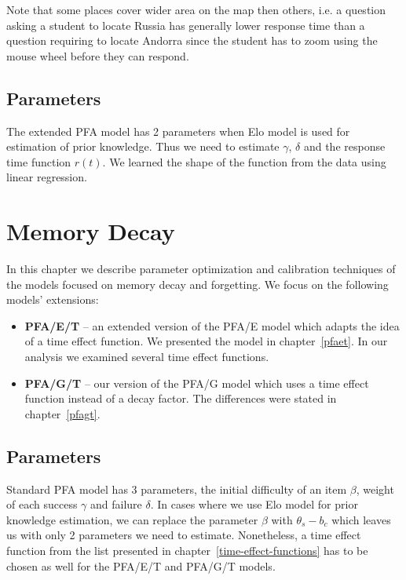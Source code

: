 Note that some places cover wider area on the map then others, i.e. a question asking a student to locate Russia has generally lower response time than a question requiring to locate Andorra since the student has to zoom using the mouse wheel before they can respond.

\subsection{Parameters}
\label{response-parameters}

The extended PFA model has 2 parameters when Elo model is used for estimation of prior knowledge. Thus we need to estimate $\gamma$, $\delta$ and the response time function $r(t)$. We learned the shape of the function from the data using linear regression.

\section{Memory Decay}

In this chapter we describe parameter optimization and calibration techniques of the models focused on memory decay and forgetting. We focus on the following models' extensions:

\begin{itemize}
  \item \textbf{PFA/E/T} -- an extended version of the PFA/E model which adapts the idea of a time effect function. We presented the model in chapter~\ref{pfaet}. In our analysis we examined several time effect functions.
  \item \textbf{PFA/G/T} -- our version of the PFA/G model which uses a time effect function instead of a decay factor. The differences were stated in chapter~\ref{pfagt}.
\end{itemize}

\subsection{Parameters}
\label{memory-parameters}

Standard PFA model has 3 parameters, the initial difficulty of an item $\beta$, weight of each success $\gamma$ and failure $\delta$. In cases where we use Elo model for prior knowledge estimation, we can replace the parameter $\beta$ with $\theta_s - b_c$ which leaves us with only 2 parameters we need to estimate. Nonetheless, a time effect function from the list presented in chapter~\ref{time-effect-functions} has to be chosen as well for the PFA/E/T and PFA/G/T models.

